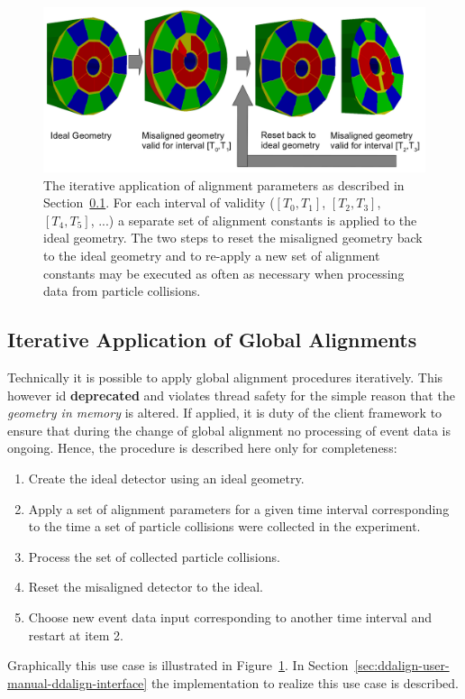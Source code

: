 \documentclass[10pt,a4paper]{article}
\begin{document}
\begin{figure}[t]
  \begin{center}
    \includegraphics[width=160mm] {DDAlign-iterative-misalignment}
    \caption{The iterative application of alignment parameters as described
    in Section~\ref{subsect:ddalign-intro-iterative-alignments}.
    For each interval of validity 
    ($[T_0,T_1]$, $[T_2,T_3]$, $[T_4,T_5]$, ...)
    a separate set of alignment constants is applied to the ideal geometry.
    The two steps to reset the misaligned geometry back to the ideal
    geometry and
    to re-apply a new set of alignment constants may be executed as 
    often as necessary when processing data from particle collisions.}
    \label{fig:ddalign-aligned-iterative}
  \end{center}
\end{figure}

\subsection{Iterative Application of Global Alignments}
\label{subsect:ddalign-intro-iterative-alignments}
\noindent
Technically it is possible to apply global alignment procedures iteratively.
This however id {\bf{deprecated}} and violates thread safety for the simple reason
that the {\it{geometry in memory}} is altered. If applied, it is duty of the 
client framework to ensure that during the change of global alignment 
no processing of event data is ongoing.
Hence, the procedure is described here only for completeness:
\begin{enumerate}\itemcompact
\item Create the ideal detector using an ideal geometry.
\item Apply a set of alignment parameters for a given time 
    interval corresponding to the 
    time a set of particle collisions were collected in the experiment.
\item Process the set of collected particle collisions.
\item Reset the misaligned detector to the ideal.
\item Choose new event data input corresponding to another time interval
    and restart at item 2.
\end{enumerate}
Graphically this use case is illustrated in 
Figure~\ref{fig:ddalign-aligned-iterative}. In 
Section~\ref{sec:ddalign-user-manual-ddalign-interface} the implementation 
to realize this use case is described.
\end{document}
